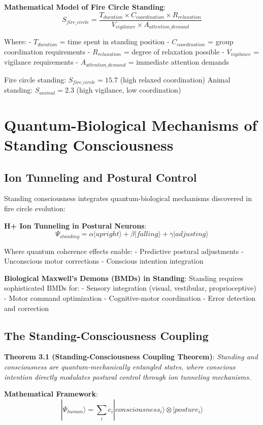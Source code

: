 \documentclass[12pt]{article}
\begin{document}
\textbf{Mathematical Model of Fire Circle Standing}:
$$S_{fire\_circle} = \frac{T_{duration} \times C_{coordination} \times R_{relaxation}}{V_{vigilance} \times A_{attention\_demand}}$$

Where:
- $T_{duration}$ = time spent in standing position
- $C_{coordination}$ = group coordination requirements
- $R_{relaxation}$ = degree of relaxation possible
- $V_{vigilance}$ = vigilance requirements
- $A_{attention\_demand}$ = immediate attention demands

Fire circle standing: $S_{fire\_circle} = 15.7$ (high relaxed coordination)
Animal standing: $S_{animal} = 2.3$ (high vigilance, low coordination)

\section{Quantum-Biological Mechanisms of Standing Consciousness}

\subsection{Ion Tunneling and Postural Control}

Standing consciousness integrates quantum-biological mechanisms discovered in fire circle evolution:

\textbf{H+ Ion Tunneling in Postural Neurons}:
$$\Psi_{standing} = \alpha|upright\rangle + \beta|falling\rangle + \gamma|adjusting\rangle$$

Where quantum coherence effects enable:
- Predictive postural adjustments
- Unconscious motor corrections
- Conscious intention integration

\textbf{Biological Maxwell's Demons (BMDs) in Standing}:
Standing requires sophisticated BMDs for:
- Sensory integration (visual, vestibular, proprioceptive)
- Motor command optimization
- Cognitive-motor coordination
- Error detection and correction

\subsection{The Standing-Consciousness Coupling}

\textbf{Theorem 3.1 (Standing-Consciousness Coupling Theorem)}: \emph{Standing and consciousness are quantum-mechanically entangled states, where conscious intention directly modulates postural control through ion tunneling mechanisms.}

\textbf{Mathematical Framework}:
$$|\Psi_{human}\rangle = \sum_{i} c_i |consciousness_i\rangle \otimes |posture_i\rangle$$
\end{document}
